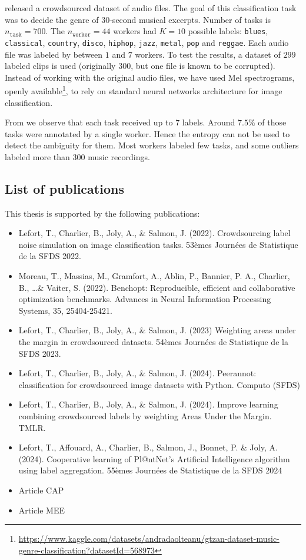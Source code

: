 \citet{rodrigues2014gaussian} released a crowdsourced dataset of audio files.
The goal of this classification task was to decide the genre of $ 30$-second musical excerpts. Number of tasks is $n_{\texttt{task}}=700$.
The $n_{\texttt{worker}}=44$ workers had $K=10$ possible labels: \texttt{blues}, \texttt{classical}, \texttt{country}, \texttt{disco}, \texttt{hiphop}, \texttt{jazz}, \texttt{metal}, \texttt{pop} and \texttt{reggae}.
Each audio file was labeled by between $1$ and $7$ workers.
To test the results, a dataset of $299$ labeled clips is used (originally $300$, but one file is known to be corrupted).
Instead of working with the original audio files, we have used Mel spectrograms, openly available\footnote{ \scriptsize \url{https://www.kaggle.com/datasets/andradaolteanu/gtzan-dataset-music-genre-classification?datasetId=568973}}, to rely on standard neural networks architecture for image classification.

From  we observe that each task received up to $7$ labels. Around $7.5\%$ of those tasks were annotated by a single worker. Hence the entropy can not be used to detect the ambiguity for them.
Most workers labeled few tasks, and some outliers labeled more than $300$ music recordings.

\subsection{List of publications}

This thesis is supported by the following publications:
\begin{itemize}
    \item Lefort, T., Charlier, B., Joly, A., \& Salmon, J. (2022). Crowdsourcing label noise simulation on image classification tasks. 53èmes Journées de Statistique de la SFDS 2022.
    \item Moreau, T., Massias, M., Gramfort, A., Ablin, P., Bannier, P. A., Charlier, B., \dots \& Vaiter, S. (2022). Benchopt: Reproducible, efficient and collaborative optimization benchmarks. Advances in Neural Information Processing Systems, 35, 25404-25421.
    \item Lefort, T., Charlier, B., Joly, A., \& Salmon, J. (2023) Weighting areas under the margin in crowdsourced datasets. 54èmes Journées de Statistique de la SFDS 2023.
    \item Lefort, T., Charlier, B., Joly, A., \& Salmon, J. (2024). Peerannot: classification for crowdsourced image datasets with Python. Computo (SFDS)
    \item Lefort, T., Charlier, B., Joly, A., \& Salmon, J. (2024). Improve learning combining crowdsourced labels by weighting Areas Under the Margin. TMLR.
    \item Lefort, T., Affouard, A., Charlier, B., Salmon, J., Bonnet, P. \& Joly, A. (2024). Cooperative learning of Pl@ntNet's Artificial Intelligence algorithm using label aggregation. 55èmes Journées de Statistique de la SFDS 2024
    \item Article CAP
    \item Article MEE
\end{itemize}


